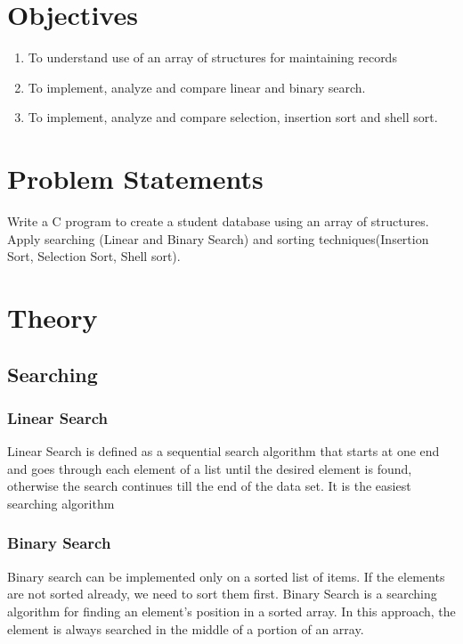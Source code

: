 \documentclass[11pt]{article}
\begin{document}
\tableofcontents
\thispagestyle{empty}
\clearpage


\setcounter{page}{1}

\section{Objectives}
\begin{enumerate}
	\item To understand use of an array of structures for maintaining records
	\item To implement, analyze and compare linear and binary search.
	\item To implement, analyze and compare selection, insertion sort and shell sort.
\end{enumerate}

\section{Problem Statements}
Write a C program to create a student database using an array of structures. Apply searching (Linear and Binary Search) and sorting techniques(Insertion Sort, Selection Sort, Shell sort).

\section{Theory}

\subsection{Searching}
\subsubsection{Linear Search}
Linear Search is defined as a sequential search algorithm that starts at one end and goes through each element of a list until the desired element is found, otherwise the search continues till the end of the data set. It is the easiest searching algorithm
\subsubsection{Binary Search}
Binary search can be implemented only on a sorted list of items. If the elements are not sorted already, we need to sort them first.
Binary Search is a searching algorithm for finding an element's position in a sorted array. In this approach, the element is always searched in the middle of a portion of an array.
\end{document}
